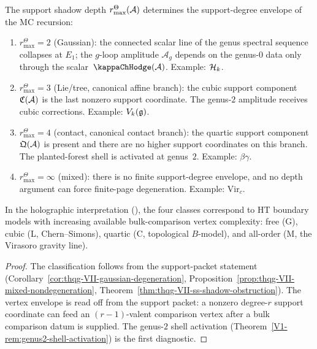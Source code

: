 \begin{theorem}
The support shadow depth \(r^\Theta_{\max}(\mathcal{A})\) determines the
support-degree envelope of the MC recursion:
\begin{enumerate}[label=\textup{(\roman*)}]
\item \(r^\Theta_{\max}=2\) \textup{(}Gaussian\textup{)}:
 the connected scalar line of the genus spectral sequence collapses
 at \(E_1\); the
 $g$-loop amplitude $\mathcal{A}_g$ depends on the genus-$0$
 data only through the scalar~$\kappaChHodge(\cA)$.
 Example: $\mathcal{H}_k$.
\item \(r^\Theta_{\max}=3\) \textup{(}Lie/tree, canonical affine
 branch\textup{)}: the cubic support component \(\mathfrak{C}(\mathcal{A})\) is the
 last nonzero support coordinate. The genus-$2$ amplitude receives
 cubic corrections. Example: $V_k(\mathfrak{g})$.
\item \(r^\Theta_{\max}=4\) \textup{(}contact, canonical contact
 branch\textup{)}: the quartic support component
 \(\mathfrak{Q}(\mathcal{A})\) is present and there are no higher support
 coordinates on this branch. The planted-forest shell is activated at
 genus~$2$. Example: $\beta\gamma$.
\item \(r^\Theta_{\max}=\infty\) \textup{(}mixed\textup{)}:
 there is no finite support-degree envelope, and no depth argument can
 force finite-page degeneration. Example: $\mathrm{Vir}_c$.
\end{enumerate}
In the holographic interpretation \textup{(}\ClaimStatusHeuristic{}\textup{)},
the four classes correspond to HT boundary models with increasing
available bulk-comparison vertex complexity: free \textup{(}G\textup{)},
cubic \textup{(}L, Chern--Simons\textup{)},
quartic \textup{(}C, topological $B$-model\textup{)},
and all-order \textup{(}M, the Virasoro gravity line\textup{)}.
\end{theorem}

\begin{proof}
The classification follows from the support-packet statement
(Corollary~\ref{cor:thqg-VII-gaussian-degeneration},
Proposition~\ref{prop:thqg-VII-mixed-nondegeneration},
Theorem~\ref{thm:thqg-VII-ss-shadow-obstruction}).
The vertex envelope is read off from the support packet: a nonzero
degree-\(r\) support coordinate can feed an \((r{-}1)\)-valent
comparison vertex after a bulk comparison datum is supplied. The
genus-$2$ shell activation
(Theorem~\ref{V1-rem:genus2-shell-activation})
is the first diagnostic.
\end{proof}

